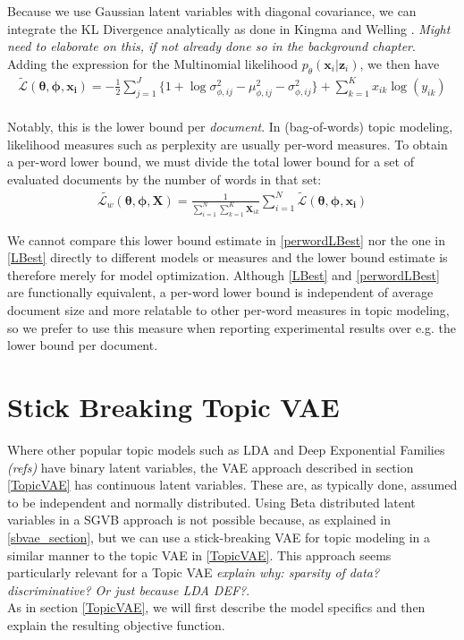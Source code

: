 \documentclass{report}
\begin{document}
Because we use Gaussian latent variables with diagonal covariance, we can integrate the KL Divergence analytically as done in Kingma and Welling \cite{kingma2013auto}. \textit{Might need to elaborate on this, if not already done so in the background chapter}. Adding the expression for the Multinomial likelihood $p_\theta(\mathbf{x}_i|\mathbf{z}_i)$, we then have
\begin{align}\label{LBest}
\tilde{\mathcal{L}}(\boldsymbol{\theta}, \boldsymbol{\phi}, \mathbf{x_i}) = - \frac{1}{2}\sum\limits_{j=1}^{J}\{1+\log \sigma_{\phi ,ij}^2 - \mu_{\phi,ij}^2 - \sigma_{\phi ,ij}^2\}  + 
\sum_{k=1}^K x_{ik} \log (y_{ik})
\end{align}
\\
Notably, this is the lower bound per \textit{document}. In (bag-of-words) topic modeling, likelihood measures such as perplexity are usually per-word measures. To obtain a per-word lower bound, we must divide the total lower bound for a set of evaluated documents by the number of words in that set: 
\begin{align}\label{perwordLBest}
\tilde{\mathcal{L}_w}(\boldsymbol{\theta}, \boldsymbol{\phi}, \mathbf{X}) = \frac{1}{\sum\limits_{i=1}^{N}\sum\limits_{k=1}^{K}\mathbf{X}_{ik}}\sum\limits_{i=1}^N \tilde{\mathcal{L}}(\boldsymbol{\theta}, \boldsymbol{\phi}, \mathbf{x_i})
\end{align}

We cannot compare this lower bound estimate in \ref{perwordLBest} nor the one in \ref{LBest} directly to different models or measures and the lower bound estimate is therefore merely for model optimization. Although \ref{LBest} and \ref{perwordLBest} are functionally equivalent, a per-word lower bound is independent of average document size and more relatable to other per-word measures in topic modeling, so we prefer to use this measure when reporting experimental results over e.g. the lower bound per document.



\section{Stick Breaking Topic VAE}
Where other popular topic models such as LDA and Deep Exponential Families \textit{(refs)} have binary latent variables, the VAE approach described in section \ref{TopicVAE} has continuous latent variables. These are, as typically done, assumed to be independent and normally distributed. Using Beta distributed latent variables in a SGVB approach is not possible because, as explained in \ref{sbvae_section}, but we can use a stick-breaking VAE for topic modeling in a similar manner to the topic VAE in \ref{TopicVAE}. This approach seems particularly relevant for a Topic VAE \textit{explain why: sparsity of data? discriminative? Or just because LDA DEF?}. \\
As in section \ref{TopicVAE}, we will first describe the model specifics and then explain the resulting objective function.
\end{document}
